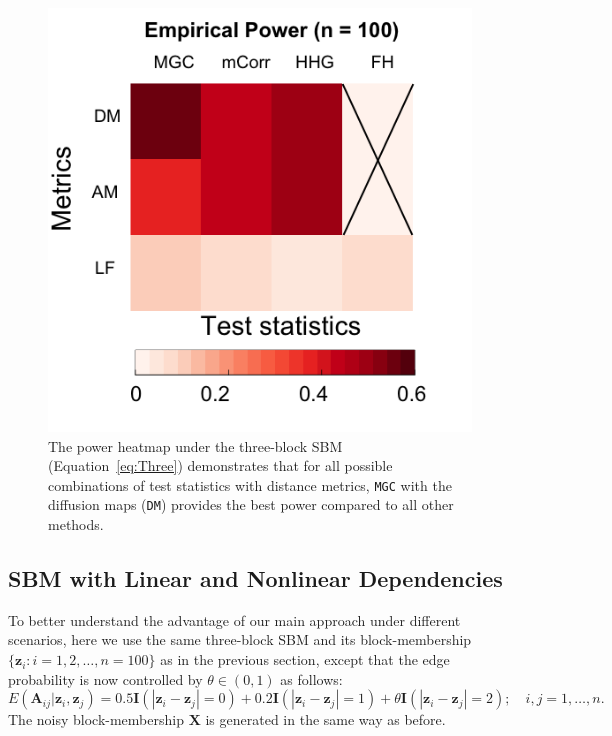 \documentclass[12pt]{article}
\theoremstyle{definition}
\begin{document}
	\begin{figure}
		\centering
		\includegraphics[width=0.4\paperwidth, height=0.4\paperwidth]{../Figure/ThreeSBM_Elbow3.png}
		\caption{The power heatmap under the three-block SBM (Equation~\ref{eq:Three}) demonstrates that for all possible combinations of test statistics with distance metrics, \texttt{MGC} with the diffusion maps (\texttt{DM}) provides the best power compared to all other methods.}
		\label{fig:threeSBM}
	\end{figure}
	
	\subsection{SBM with Linear and Nonlinear Dependencies}
	
	To better understand the advantage of our main approach under different scenarios, here we use the same three-block SBM and its block-membership $\{ \mathbf{z}_{i} : i=1,2, \ldots, n=100 \}$ as in the previous section, except that the edge probability is now controlled by $\theta \in (0, 1)$ as follows:
	\begin{equation}
	E(\mathbf{A}_{ij} | \mathbf{z}_{i}, \mathbf{z}_{j}) = 0.5 \mathbf{I}(|\mathbf{z}_{i} - \mathbf{z}_{j}| = 0) + 0.2 \mathbf{I}(|\mathbf{z}_{i} - \mathbf{z}_{j}| = 1) + \theta \mathbf{I}(|\mathbf{z}_{i} - \mathbf{z}_{j}| = 2); \quad i,j = 1, \ldots, n.
	\label{eq:mono}
	\end{equation}
	The noisy block-membership $\mathbf{X}$ is generated in the same way as before.
	
\end{document}
